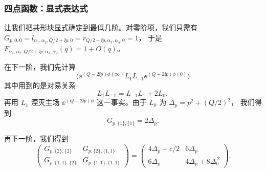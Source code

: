 %

\subsubsection{四点函数：显式表达式}

让我们把共形块显式确定到最低几阶。对零阶项，我们只需有
$G_{p,0,0}=l_{\alpha_1,\alpha_2,Q/2+\ii p,0}=r_{Q/2-\ii p,\alpha_3,\alpha_4,0}=1$，
于是 $F_{\alpha_1,\alpha_2,Q/2+\ii p,\alpha_3,\alpha_4}(q)=1+O(q)$。

在下一阶，我们先计算
\begin{equation}
  \langle \ee^{(Q-2\ii p)\phi(\infty)}L_1L_{-1}\ee^{(Q+2\ii p)\phi(0)}\rangle
  \tag{2.61}
\end{equation}
其中用到的是对易关系
\begin{equation}
  L_1L_{-1} = L_{-1}L_1 + 2L_0,
  \tag{2.62}
\end{equation}
再用 $L_1$ 湮灭主场 $\ee^{(Q+2\ii p)\phi}$ 这一事实。由于 $L_0$ 为 $\Delta_p=p^2+(Q/2)^2$，
我们得到
\begin{equation}
  G_{p,\{1\},\{1\}} = 2\Delta_p.
  \tag{2.63}
\end{equation}


再下一阶，我们得到
\begin{equation}
  \begin{pmatrix}
    G_{p,\{2\},\{2\}} & G_{p,\{2\},\{1,1\}} \\
    G_{p,\{1,1\},\{2\}} & G_{p,\{1,1\},\{1,1\}}
  \end{pmatrix}
  = \begin{pmatrix}
    4\Delta_p + c/2 & 6\Delta_p \\
    6\Delta_p & 4\Delta_p + 8\Delta_0^{\,2}
  \end{pmatrix}.
  \tag{2.64}
\end{equation}

